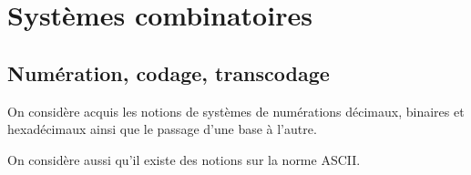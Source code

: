 \setchapterpreamble[u]{\margintoc}

\chapter{Systèmes combinatoires}
%
%
%
%
%
%
%
%
%
%
%
%
%
%
%
%
%
%
%
%
%
%
%
%
%
%

\section{Numération, codage, transcodage}
\begin{rem}
On considère acquis les notions de systèmes de numérations décimaux, binaires et hexadécimaux ainsi que le passage d'une base à l'autre.

On considère aussi qu'il existe des notions sur la norme ASCII. 
\end{rem}

